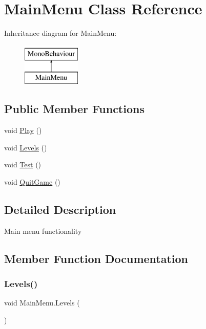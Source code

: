 \hypertarget{class_main_menu}{}\section{Main\+Menu Class Reference}
\label{class_main_menu}
Inheritance diagram for Main\+Menu\+:\begin{figure}[H]
\begin{center}
\leavevmode
\includegraphics[height=2.000000cm]{class_main_menu}
\end{center}
\end{figure}
\subsection*{Public Member Functions}
\begin{DoxyCompactItemize}
\item 
void \mbox{\hyperlink{class_main_menu_a18b84d06aaaeb1086349846809d31ab3}{Play}} ()
\item 
void \mbox{\hyperlink{class_main_menu_a7b541911775a290b2f3b4b22db4b830a}{Levels}} ()
\item 
void \mbox{\hyperlink{class_main_menu_a8c08f64fe9eb1b70fb787c0215bd1023}{Test}} ()
\item 
void \mbox{\hyperlink{class_main_menu_a485db7cf60c0b93ecc87b9273bcce78b}{Quit\+Game}} ()
\end{DoxyCompactItemize}


\subsection{Detailed Description}
Main menu functionality 

\subsection{Member Function Documentation}
\mbox{\label{class_main_menu_a7b541911775a290b2f3b4b22db4b830a}} 
\subsubsection{\texorpdfstring{Levels()}{Levels()}}
{\footnotesize\ttfamily void Main\+Menu.\+Levels (\begin{DoxyParamCaption}{ }\end{DoxyParamCaption})\hspace{0.3cm}{\ttfamily [inline]}}

